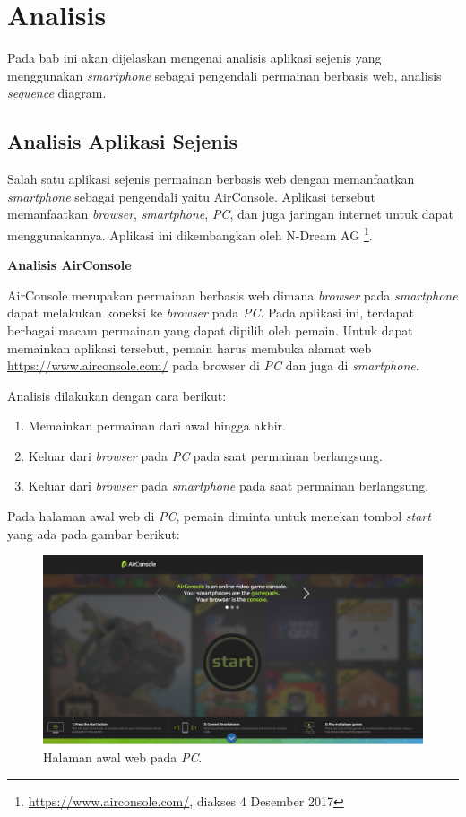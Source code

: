\chapter{Analisis}
\label{chap:analisis}

Pada bab ini akan dijelaskan mengenai analisis aplikasi sejenis yang menggunakan \textit{smartphone} sebagai pengendali permainan berbasis web, analisis \textit{sequence} diagram.

\section{Analisis Aplikasi Sejenis}
\label{sec:AirConsole}

Salah satu aplikasi sejenis permainan berbasis web dengan memanfaatkan \textit{smartphone} sebagai pengendali yaitu AirConsole. Aplikasi tersebut memanfaatkan \textit{browser}, \textit{smartphone}, \textit{PC}, dan juga jaringan internet untuk dapat menggunakannya. Aplikasi ini dikembangkan oleh N-Dream AG \footnote{\url{https://www.airconsole.com/}, diakses 4 Desember 2017}.

\textbf{Analisis AirConsole} 

AirConsole merupakan permainan berbasis web dimana \textit{browser} pada \textit{smartphone} dapat melakukan koneksi ke \textit{browser} pada  \textit{PC}. Pada aplikasi ini, terdapat berbagai macam permainan yang dapat dipilih oleh pemain. Untuk dapat memainkan aplikasi tersebut, pemain harus membuka alamat web \url{https://www.airconsole.com/} pada browser di \textit{PC} dan juga di \textit{smartphone}.

Analisis dilakukan dengan cara berikut:
\begin{enumerate}
	\item Memainkan permainan dari awal hingga akhir.
	\item Keluar dari \textit{browser} pada \textit{PC} pada saat permainan berlangsung.
	\item Keluar dari \textit{browser} pada \textit{smartphone} pada saat permainan berlangsung.
\end{enumerate}
Pada halaman awal web di \textit{PC}, pemain diminta untuk menekan tombol \textit{start} yang ada pada gambar berikut: 

\begin{figure}[H]
	\centering
	\includegraphics[scale=0.2]{Gambar/con1_home1}
	\caption{Halaman awal web pada \textit{PC}.}
	\label{fig:16_con1_home1}
\end{figure}

